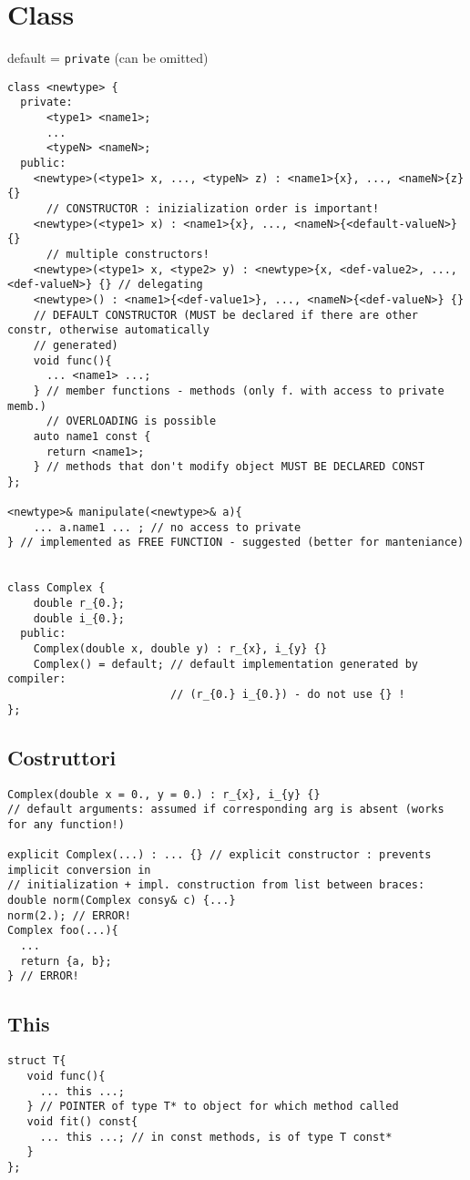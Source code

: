 \documentclass[10pt, oneside]{Book}
\begin{document}
\section{Class}
default = \texttt{private} (can be omitted)
\begin{verbatim}
class <newtype> {
  private:
      <type1> <name1>;
      ...
      <typeN> <nameN>;
  public:
    <newtype>(<type1> x, ..., <typeN> z) : <name1>{x}, ..., <nameN>{z} {}
      // CONSTRUCTOR : inizialization order is important!
    <newtype>(<type1> x) : <name1>{x}, ..., <nameN>{<default-valueN>} {}
      // multiple constructors!
    <newtype>(<type1> x, <type2> y) : <newtype>{x, <def-value2>, ..., <def-valueN>} {} // delegating
    <newtype>() : <name1>{<def-value1>}, ..., <nameN>{<def-valueN>} {}
    // DEFAULT CONSTRUCTOR (MUST be declared if there are other constr, otherwise automatically 
    // generated)
    void func(){
      ... <name1> ...;      
    } // member functions - methods (only f. with access to private memb.)
      // OVERLOADING is possible
    auto name1 const {
      return <name1>;    
    } // methods that don't modify object MUST BE DECLARED CONST
};

<newtype>& manipulate(<newtype>& a){
    ... a.name1 ... ; // no access to private
} // implemented as FREE FUNCTION - suggested (better for manteniance)


class Complex {
    double r_{0.};
    double i_{0.};
  public:
    Complex(double x, double y) : r_{x}, i_{y} {} 
    Complex() = default; // default implementation generated by compiler:
                         // (r_{0.} i_{0.}) - do not use {} ! 
};
\end{verbatim}
\subsection{Costruttori}
\begin{verbatim}
Complex(double x = 0., y = 0.) : r_{x}, i_{y} {} 
// default arguments: assumed if corresponding arg is absent (works for any function!)

explicit Complex(...) : ... {} // explicit constructor : prevents implicit conversion in
// initialization + impl. construction from list between braces: 
double norm(Complex consy& c) {...}
norm(2.); // ERROR!
Complex foo(...){
  ...
  return {a, b};
} // ERROR!
\end{verbatim}
\subsection{This}
\begin{verbatim}
struct T{
   void func(){
     ... this ...;   
   } // POINTER of type T* to object for which method called
   void fit() const{
     ... this ...; // in const methods, is of type T const*
   }
};
\end{verbatim}
\end{document}
